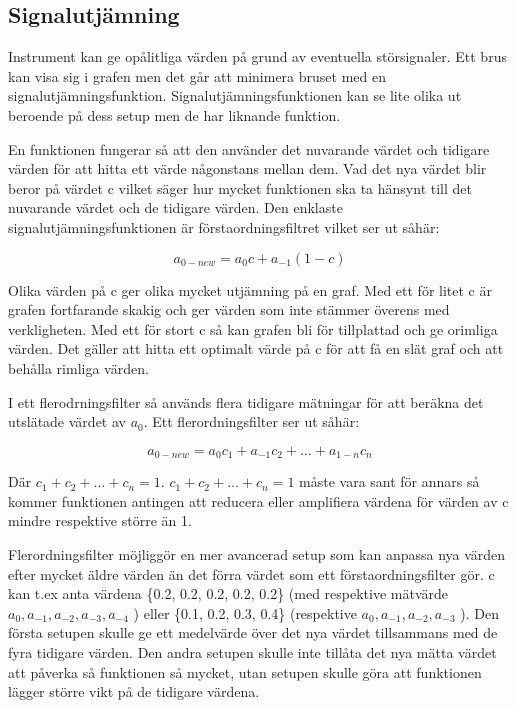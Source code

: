 \subsection{Signalutjämning}
Instrument kan ge opålitliga värden på grund av eventuella störsignaler.
Ett brus kan visa sig i grafen men det går att minimera bruset med en signalutjämningsfunktion. 
Signalutjämningsfunktionen kan se lite olika ut beroende på dess setup men de har liknande funktion. 

En funktionen fungerar så att den använder det nuvarande värdet och
tidigare värden för att hitta ett värde någonstans mellan dem. Vad det 
nya värdet blir beror på värdet c vilket säger hur mycket funktionen ska 
ta hänsynt till det nuvarande värdet och de tidigare värden. Den enklaste
signalutjämningsfunktionen är förstaordningsfiltret vilket ser ut såhär: 

\begin{equation}
	a_{0-new} = a_{0}c + a_{-1}(1 - c)
\end{equation}

Olika värden på c ger olika mycket utjämning på en graf. Med ett för litet c är
grafen fortfarande skakig och ger värden som inte stämmer överens med
verkligheten. Med ett för stort c så kan grafen bli för tillplattad och ge
orimliga värden. Det gäller att hitta ett optimalt värde på c för att få
en slät graf och att behålla rimliga värden.

I ett flerodrningsfilter så används flera tidigare mätningar för att
beräkna det utslätade värdet av $a_{0}$. Ett flerordningsfilter ser ut såhär:

\begin{equation}
	a_{0-new} = a_{0}c_{1} + a_{-1}c_{2} + … + a_{1-n}c_{n} 
\end{equation}

Där $c_1 + c_2 + … + c_n = 1$.
 $ c_1 + c_2 + … + c_n = 1$
 måste vara sant för annars så kommer
funktionen antingen att reducera eller amplifiera värdena för värden
av c mindre respektive större än 1.

Flerordningsfilter möjliggör en mer avancerad setup som kan anpassa
nya värden efter mycket äldre värden än det förra värdet som ett
förstaordningsfilter gör. 
c kan t.ex anta värdena \{0.2, 0.2, 0.2, 0.2, 0.2\} (med respektive mätvärde 
$a_0, a_{-1}, a_{-2}, a_{-3}, a_{-4}$
 ) eller \{0.1, 0.2, 0.3, 0.4\}
 (respektive $ a_0, a_{-1}, a_{-2}, a_{-3} $ ). 
Den första setupen skulle ge ett medelvärde över det nya värdet 
tillsammans med de fyra tidigare värden. Den andra setupen skulle
 inte tillåta det nya mätta värdet att påverka så funktionen 
så mycket, utan setupen skulle göra att funktionen lägger större
 vikt på de tidigare värdena.

